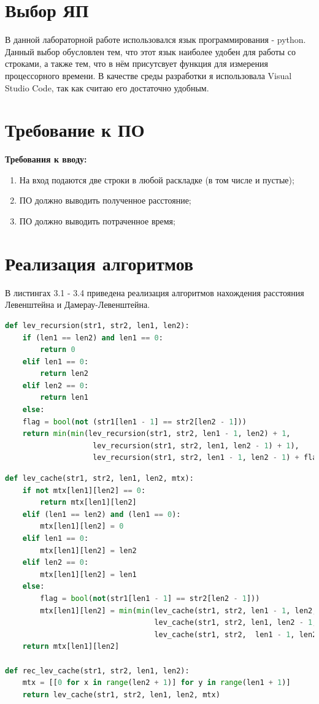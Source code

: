\documentclass[12pt]{report}
\begin{document}
\section{Выбор ЯП}
В данной лабораторной работе использовался язык программирования - python. Данный выбор обусловлен тем, что этот язык наиболее удобен для работы со строками, а также тем, что в нём присутсвует функция для измерения процессорного времени.
В качестве среды разработки я использовала Visual Studio Code, так как считаю его достаточно удобным.

\section{Требование к ПО}
\textbf{Требования к вводу:}
\begin{enumerate}
	\item На вход подаются две строки в любой раскладке (в том числе и пустые);
	\item ПО должно выводить полученное расстояние;
	\item ПО должно выводить потраченное время;
\end{enumerate}

\section{Реализация алгоритмов}

В листингах 3.1 - 3.4 приведена реализация алгоритмов нахождения расстояния Левенштейна и Дамерау-Левенштейна.

\begin{lstlisting}[label=some-code,caption=Функция нахождения расстояния Левенштейна рекурсивно,language=Python]
def lev_recursion(str1, str2, len1, len2):
	if (len1 == len2) and len1 == 0:
		return 0
	elif len1 == 0:
		return len2
	elif len2 == 0:
		return len1
	else:
	flag = bool(not (str1[len1 - 1] == str2[len2 - 1]))
	return min(min(lev_recursion(str1, str2, len1 - 1, len2) + 1,
					lev_recursion(str1, str2, len1, len2 - 1) + 1),
					lev_recursion(str1, str2, len1 - 1, len2 - 1) + flag)
\end{lstlisting}

\begin{lstlisting}[label=some-code,caption=Функция нахождения расстояние Левенштейна рекурсивно с помощью кэша,language=Python]
def lev_cache(str1, str2, len1, len2, mtx):
	if not mtx[len1][len2] == 0:
		return mtx[len1][len2]
	elif (len1 == len2) and (len1 == 0):
		mtx[len1][len2] = 0
	elif len1 == 0:
		mtx[len1][len2] = len2
	elif len2 == 0:
		mtx[len1][len2] = len1
	else:
		flag = bool(not(str1[len1 - 1] == str2[len2 - 1]))
		mtx[len1][len2] = min(min(lev_cache(str1, str2, len1 - 1, len2, mtx) + 1,
								  lev_cache(str1, str2, len1, len2 - 1, mtx) + 1),
								  lev_cache(str1, str2,  len1 - 1, len2 - 1, mtx) + flag)
	return mtx[len1][len2]

def rec_lev_cache(str1, str2, len1, len2):
	mtx = [[0 for x in range(len2 + 1)] for y in range(len1 + 1)]
	return lev_cache(str1, str2, len1, len2, mtx)
\end{lstlisting}
\end{document}
